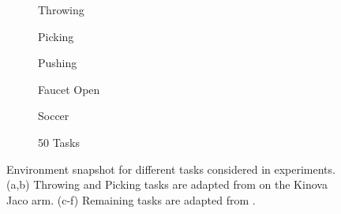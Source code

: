 \documentclass{article}
\begin{document}
\begin{figure}[t!]
\centering
\begin{subfigure}[b]{0.155\linewidth}
    \vspace{-0.18in}
    \caption{\small Throwing}
    \label{fig:throw-env}
\end{subfigure}
\begin{subfigure}[b]{0.155\linewidth}
    \vspace{-0.18in}
    \caption{\small Picking}
    \label{fig:pick-env}
\end{subfigure}
\begin{subfigure}[b]{0.155\linewidth}
    \vspace{-0.18in}
    \caption{\small Pushing}
    \label{fig:push-env}
\end{subfigure}
\begin{subfigure}[b]{0.155\linewidth}
    \vspace{-0.18in}
    \caption{\small Faucet Open}
    \label{fig:faucet-env}
\end{subfigure}
\begin{subfigure}[b]{0.155\linewidth}
    \vspace{-0.18in}
    \caption{\small Soccer}
    \label{fig:soccer-env}
\end{subfigure}
\begin{subfigure}[b]{0.184\linewidth}
    \vspace{-0.18in}
    \caption{\small 50 Tasks}
    \label{fig:door-env}
\end{subfigure}
\vspace{-0.06in}
\caption{\small Environment snapshot for different tasks considered in experiments. (a,b) Throwing and Picking tasks are adapted from \cite{ghosh2017divide} on the Kinova Jaco arm. (c-f) Remaining tasks are adapted from \citet{yu2019meta}.}
\vspace{-0.01in}
\label{fig:rl-envs}
\end{figure}
\end{document}
